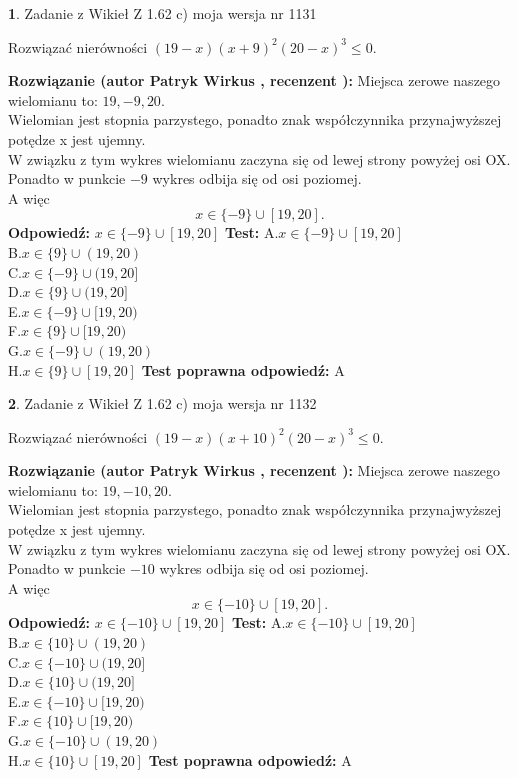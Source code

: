 \documentclass[12pt, a4paper]{article}
\theoremstyle{definition} %
\newtheorem{zad}{}
\newcommand{\zadStart}[1]{\begin{zad}#1\newline}
\newcommand{\zadStop}{\end{zad}}
\newcommand{\rozwStart}[2]{\noindent \textbf{Rozwiązanie (autor #1 , recenzent #2): }\newline}
\newcommand{\rozwStop}{\newline}
\newcommand{\odpStart}{\noindent \textbf{Odpowiedź:}\newline}
\newcommand{\odpStop}{\newline}
\newcommand{\testStart}{\noindent \textbf{Test:}\newline}
\newcommand{\testStop}{\newline}
\newcommand{\kluczStart}{\noindent \textbf{Test poprawna odpowiedź:}\newline}
\newcommand{\kluczStop}{\newline}
\begin{document}
\zadStart{Zadanie z Wikieł Z 1.62 c) moja wersja nr 1131}

Rozwiązać nierówności $(19-x)(x+9)^{2}(20-x)^{3}\le0$.
\zadStop
\rozwStart{Patryk Wirkus}{}
Miejsca zerowe naszego wielomianu to: $19, -9, 20$.\\
Wielomian jest stopnia parzystego, ponadto znak współczynnika przy\linebreak najwyższej potędze x jest ujemny.\\ W związku z tym wykres wielomianu zaczyna się od lewej strony powyżej osi OX.\\
Ponadto w punkcie $-9$ wykres odbija się od osi poziomej.\\
A więc $$x \in \{-9\} \cup [19,20].$$
\rozwStop
\odpStart
$x \in \{-9\} \cup [19,20]$
\odpStop
\testStart
A.$x \in \{-9\} \cup [19,20]$\\
B.$x \in \{9\} \cup (19,20)$\\
C.$x \in \{-9\} \cup (19,20]$\\
D.$x \in \{9\} \cup (19,20]$\\
E.$x \in \{-9\} \cup [19,20)$\\
F.$x \in \{9\} \cup [19,20)$\\
G.$x \in \{-9\} \cup (19,20)$\\
H.$x \in \{9\} \cup [19,20]$
\testStop
\kluczStart
A
\kluczStop



\zadStart{Zadanie z Wikieł Z 1.62 c) moja wersja nr 1132}

Rozwiązać nierówności $(19-x)(x+10)^{2}(20-x)^{3}\le0$.
\zadStop
\rozwStart{Patryk Wirkus}{}
Miejsca zerowe naszego wielomianu to: $19, -10, 20$.\\
Wielomian jest stopnia parzystego, ponadto znak współczynnika przy\linebreak najwyższej potędze x jest ujemny.\\ W związku z tym wykres wielomianu zaczyna się od lewej strony powyżej osi OX.\\
Ponadto w punkcie $-10$ wykres odbija się od osi poziomej.\\
A więc $$x \in \{-10\} \cup [19,20].$$
\rozwStop
\odpStart
$x \in \{-10\} \cup [19,20]$
\odpStop
\testStart
A.$x \in \{-10\} \cup [19,20]$\\
B.$x \in \{10\} \cup (19,20)$\\
C.$x \in \{-10\} \cup (19,20]$\\
D.$x \in \{10\} \cup (19,20]$\\
E.$x \in \{-10\} \cup [19,20)$\\
F.$x \in \{10\} \cup [19,20)$\\
G.$x \in \{-10\} \cup (19,20)$\\
H.$x \in \{10\} \cup [19,20]$
\testStop
\kluczStart
A
\kluczStop
\end{document}
